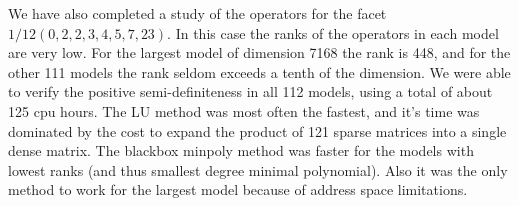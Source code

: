 We have also completed a study of the operators for the facet
$1/12 (0,2,2,3,4,5,7,23)$.  In this case the ranks of the operators in
each model are very low.
For the largest model of dimension 7168 the rank is 448, and for the 
other 111 models the rank seldom exceeds a tenth of the dimension.
We were able to verify the positive semi-definiteness in all 112 models,
using a total of about 125 cpu hours.
The LU method was most often the fastest, and
it's time was dominated by the cost to expand the product
of 121 sparse matrices into a single dense matrix.  
The blackbox minpoly method was faster for the models with lowest ranks 
(and thus smallest degree minimal polynomial).  
Also it was the only method to work for the largest 
model because of address space limitations.
